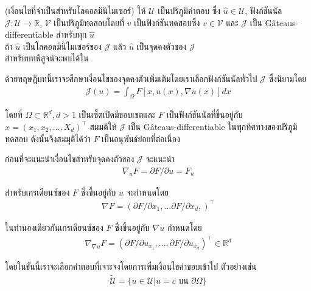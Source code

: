 \begin{Theorem}
    (เงื่อนไขที่จำเป็นสำหรับโลคอลมินิไมเซอร์) ให้ $\mathcal{U}$ เป็นปริภูมิคำตอบ ซึ่ง $\hat{u} \in \mathcal{U}$, ฟังก์ชันนัล $\mathcal{J} : \mathcal{U} \rightarrow \mathbb{R}$, $\mathcal{V}$ เป็นปริภูมิทดสอบโดยที่ $v$ เป็นฟังก์ชันทดสอบซึ่ง $v \in \mathcal{V}$ และ $\mathcal{J}$ เป็น G\^{a}teaus-differentiable สำหรับทุก $\hat{u}$\\
    ถ้า $\hat{u}$ เป็นโลคอลมินิไมเซอร์ของ $\mathcal{J}$ แล้ว $\hat{u}$ เป็นจุดคงตัวของ  $\mathcal{J}$\\
    สำหรับบทพิสูจน์จะพบได้ใน \cite{ref:calculus_of_variation}
    \label{theroem:nessery_minimizer}
\end{Theorem}

ด้วยทฤษฎีบทนี้เราจะศึกษาเงื่อนไขของจุดคงตัวเพิ่มเติมโดยเราเลือกฟังก์ชันนัลทั่วไป $\mathcal{J}$ ซึ่งนิยามโดย
\begin{align}
    \mathcal{J}(u) = \int_{\Omega} F[x,u(x),\nabla u(x)] dx
    \label{equation:general_functional}
\end{align}

โดยที่ $\Omega \subset \mathbb{R}^{d}, d>1$ เป็นเซ็ตเปิดมีขอบเขตและ $F$ เป็นฟังก์ชันนัลที่ขึ้นอยู่กับ $x=(x_1,x_2,...,X_d)^\top$ สมมติให้ $\mathcal{J}$ เป็น G\^{a}teaus-differentiable ในทุกทิศทางของปริภูมิทดสอบ ดังนั้นจึงสมมุติได้ว่า $F$  เป็นอนุพันธ์ย่อยที่ต่อเนื่อง

ก่อนที่จะแนะนำเงื่อนไขสำหรับจุดคงตัวของ $\mathcal{J}$ จะแนะนำ
\begin{align}
    \nabla_{u} F = \partial F / \partial u = F_u
\end{align}

สำหรับเกรเดียนซ์ของ $F$ ซึ่งขึ้นอยู่กับ $u$ จะกำหนดโดย
\begin{align}
    \nabla F = (\partial F / \partial x_1, ... \partial F / \partial x_d, )^\top
\end{align}

ในทำนองเดียวกันเกรเดียนซ์ของ $F$ ซึ่งขึ้นอยู่กับ $\nabla u$ กำหนดโดย
\begin{align}
    \nabla_{\nabla u} F = (\partial F / \partial u_{x_1},..., \partial F / \partial u_{x_d})^\top \in \mathbb{R}^d
\end{align}

โดยในขั้นนี้เราจะเลือกคำตอบที่เจาะจงโดยการเพิ่มเงื่อนไขค่าขอบเข้าไป ตัวอย่างเช่น
\begin{align}
    \tilde{\mathcal{U}} = \{u \in \mathcal{U} | u = c \text{ บน } \partial \Omega \}
\end{align}


